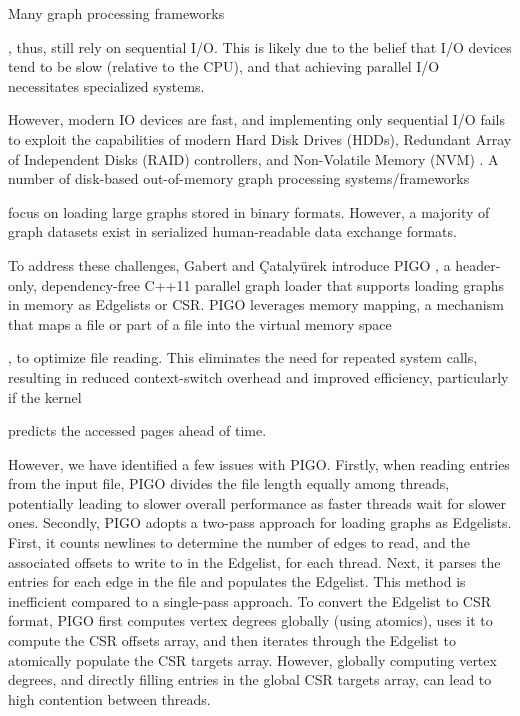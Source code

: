 Many graph processing frameworks, thus, still rely on sequential I/O. This is likely due to the belief that I/O devices tend to be slow (relative to the CPU), and that achieving parallel I/O necessitates specialized systems. However, modern IO devices are fast, and implementing only sequential I/O fails to exploit the capabilities of modern Hard Disk Drives (HDDs), Redundant Array of Independent Disks (RAID) controllers, and Non-Volatile Memory (NVM) \cite{gabert2021pigo}. A number of disk-based out-of-memory graph processing systems/frameworks \cite{kyrola2012graphchi, han2013turbograph, roy2013x, najeebullah2014bishard, lin2014mmap, zheng2015flashgraph, wang2021scaleg} focus on loading large graphs stored in binary formats. However, a majority of graph datasets exist in serialized human-readable data exchange formats.

To address these challenges, Gabert and Çatalyürek introduce PIGO \cite{gabert2021pigo}, a header-only, dependency-free C++11 parallel graph loader that supports loading graphs in memory as Edgelists or CSR. PIGO leverages memory mapping, a mechanism that maps a file or part of a file into the virtual memory space \cite{lin2014mmap}, to optimize file reading. This eliminates the need for repeated system calls, resulting in reduced context-switch overhead and improved efficiency, particularly if the kernel predicts the accessed pages ahead of time.

However, we have identified a few issues with PIGO. Firstly, when reading entries from the input file, PIGO divides the file length equally among threads, potentially leading to slower overall performance as faster threads wait for slower ones. Secondly, PIGO adopts a two-pass approach for loading graphs as Edgelists. First, it counts newlines to determine the number of edges to read, and the associated offsets to write to in the Edgelist, for each thread. Next, it parses the entries for each edge in the file and populates the Edgelist. This method is inefficient compared to a single-pass approach. To convert the Edgelist to CSR format, PIGO first computes vertex degrees globally (using atomics), uses it to compute the CSR offsets array, and then iterates through the Edgelist to atomically populate the CSR targets array. However, globally computing vertex degrees, and directly filling entries in the global CSR targets array, can lead to high contention between threads.

